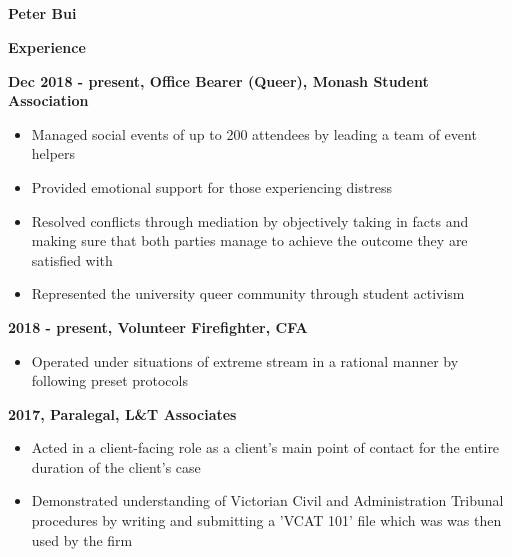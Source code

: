 \documentclass[a4paper, 11pt, draft]{memoir}
\newcommand{\SmallSep}{\vspace{0.5em}}
\newcommand{\CVSection}[1]
	{\Large\textbf{#1}\par
	\SmallSep\normalsize\normalfont}
\newcommand{\CVItem}[1]
	{\textbf{\color{RoyalBlue} #1}}
\begin{document}
    
\begin{flushright}\small
     \faMobile \\
     \faEnvelopeO \\
     \faGithub\\
     \faLinkedin\\
\end{flushright}\normalsize
\framebreak

\Huge\bfseries {\color{RoyalBlue} Peter Bui} \\

\normalsize\normalfont


    
    \CVSection{Experience}
    \CVItem{Dec 2018 - present, Office Bearer (Queer), Monash Student Association}\\
    \begin{itemize}
        \item Managed social events of up to 200 attendees by leading a team of event helpers
        \item Provided emotional support for those experiencing distress
        \item Resolved conflicts through mediation by objectively taking in facts and making sure that both parties manage to achieve the outcome they are satisfied with
        \item Represented the university queer community through student activism
    \end{itemize}
    \SmallSep
    
    \CVItem{2018 - present, Volunteer Firefighter, CFA}\\
    \begin{itemize}
        \item Operated under situations of extreme stream in a rational manner by following preset protocols
    \end{itemize}
    \SmallSep

    \CVItem{2017, Paralegal, L&T Associates}\\
    \begin{itemize}
        \item Acted in a client-facing role as a client's main point of contact for the entire duration of the client's case
        \item Demonstrated understanding of Victorian Civil and Administration Tribunal procedures by writing and submitting a 'VCAT 101' file which was was then used by the firm
    \end{itemize}
    \Smallsep
    
\end{document}
